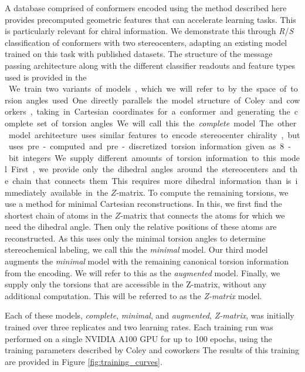 \documentclass[%
 preprint,
superscriptaddress,
 amsmath,amssymb,
 aip,
 jcp,
]{revtex4-2}
\begin{document}
A database comprised of conformers encoded using the method described here provides precomputed geometric features that can accelerate learning tasks.
This is particularly relevant for chiral information.
We demonstrate this through \textit{R}/\textit{S} classification of conformers with two stereocenters, adapting an existing model trained on this task with published datasets.\cite{Coley2021:chiro}
The structure of the message passing architecture along with the different classifier readouts and feature types used is provided in the \SI{}.
We train two variants of models, which we will refer to by the space of torsion angles used.
One directly parallels the model structure of Coley and coworkers, taking in Cartesian coordinates for a conformer and generating the complete set of torsion angles.
We will call this the \textit{complete} model.
The other model architecture uses similar features to encode stereocenter chirality, but uses pre-computed and pre-discretized torsion information given as 8-bit integers.
We supply different amounts of torsion information to this model.
First, we provide only the dihedral angles around the stereocenters and the chain that connects them.
This requires more dihedral information than is immediately available in the $Z$-matrix.
To compute the remaining torsions, we use a method for minimal Cartesian reconstructions.
In this, we first find the shortest chain of atoms in the $Z$-matrix that connects the atoms for which we need the dihedral angle.
Then only the relative positions of these atoms are reconstructed.
As this uses only the minimal torsion angles to determine stereochemical labeling, we call this the \textit{minimal} model.
Our third model augments the \textit{minimal} model with the remaining canonical torsion information from the encoding.
We will refer to this as the \textit{augmented} model.
Finally, we supply only the torsions that are accessible in the Z-matrix, without any additional computation.
This will be referred to as the \textit{Z-matrix} model.

Each of these models, \textit{complete}, \textit{minimal}, and \textit{augmented}, \textit{Z-matrix}, was initially trained over three replicates and two learning rates.
Each training run was performed on a single NVIDIA A100 GPU for up to 100 epochs, using the training parameters described by Coley and coworkers\cite{Coley2021:chiro}
The results of this training are provided in Figure \ref{fig:training_curves}.
\end{document}
